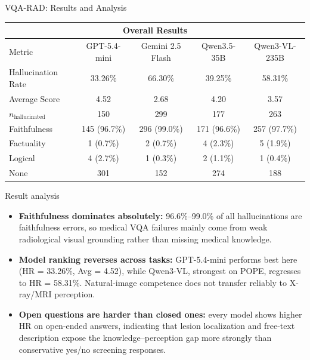 \documentclass[9pt,aspectratio=169]{beamer}
\begin{document}
\begin{frame}{VQA-RAD: Results and Analysis}
  \centering
  \footnotesize
  \begin{tabular}{l cccc}
    \toprule
    \multicolumn{5}{c}{\textbf{Overall Results}} \\
    \midrule
    Metric
      & GPT-5.4-mini & Gemini 2.5 Flash & Qwen3.5-35B & Qwen3-VL-235B \\
    \midrule
    Hallucination Rate & \cellcolor{pink!50}33.26\% & 66.30\% & 39.25\% & 58.31\% \\
    Average Score      & \cellcolor{pink!50}4.52    & 2.68    & 4.20    & 3.57 \\
    $n_{\text{hallucinated}}$ & \cellcolor{pink!50}150 & 299 & 177 & 263 \\
    \quad Faithfulness & 145 (96.7\%) & 296 (99.0\%) & 171 (96.6\%) & 257 (97.7\%) \\
    \quad Factuality   & 1 (0.7\%)    & 2 (0.7\%)    & 4 (2.3\%)    & 5 (1.9\%) \\
    \quad Logical      & 4 (2.7\%)    & 1 (0.3\%)    & 2 (1.1\%)    & 1 (0.4\%) \\
    None               & 301 & 152 & 274 & 188 \\
    \bottomrule
  \end{tabular}

  \vspace{0.45em}
  \begin{block}{Result analysis}
    \footnotesize
    \begin{itemize}\setlength{\itemsep}{0.12em}
      \item \textbf{Faithfulness dominates absolutely:}
            96.6\%--99.0\% of all hallucinations are faithfulness errors,
            so medical VQA failures mainly come from weak radiological
            visual grounding rather than missing medical knowledge.
      \item \textbf{Model ranking reverses across tasks:}
            GPT-5.4-mini performs best here
            (HR = 33.26\%, Avg = 4.52), while Qwen3-VL,
            strongest on POPE, regresses to HR = 58.31\%.
            Natural-image competence does not transfer reliably
            to X-ray/MRI perception.
      \item \textbf{Open questions are harder than closed ones:}
            every model shows higher HR on open-ended answers,
            indicating that lesion localization and free-text description
            expose the knowledge--perception gap more strongly than
            conservative yes/no screening responses.
    \end{itemize}
  \end{block}

\end{frame}
\end{document}
